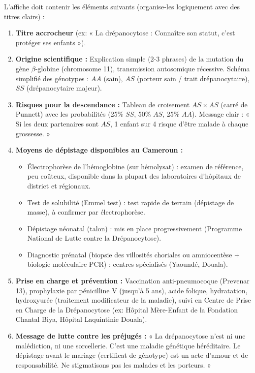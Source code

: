 \documentclass[11pt]{article}
\begin{document}
\begin{exercice}
L'affiche doit contenir les éléments suivants (organise-les logiquement avec des titres clairs) :
\begin{enumerate}
    \item \textbf{Titre accrocheur} (ex: « La drépanocytose : Connaître son statut, c'est protéger ses enfants »).
    \item \textbf{Origine scientifique :} Explication simple (2-3 phrases) de la mutation du gène $\beta$-globine (chromosome 11), transmission autosomique récessive. Schéma simplifié des génotypes : $AA$ (sain), $AS$ (porteur sain / trait drépanocytaire), $SS$ (drépanocytaire majeur).
    \item \textbf{Risques pour la descendance :} Tableau de croisement $AS \times AS$ (carré de Punnett) avec les probabilités (25\% $SS$, 50\% $AS$, 25\% $AA$). Message clair : « Si les deux partenaires sont $AS$, 1 enfant sur 4 risque d'être malade à chaque grossesse. »
    \item \textbf{Moyens de dépistage disponibles au Cameroun :}
    \begin{itemize}
        \item Électrophorèse de l'hémoglobine (sur hémolysat) : examen de référence, peu coûteux, disponible dans la plupart des laboratoires d'hôpitaux de district et régionaux.
        \item Test de solubilité (Emmel test) : test rapide de terrain (dépistage de masse), à confirmer par électrophorèse.
        \item Dépistage néonatal (talon) : mis en place progressivement (Programme National de Lutte contre la Drépanocytose).
        \item Diagnostic prénatal (biopsie des villosités choriales ou amniocentèse + biologie moléculaire PCR) : centres spécialisés (Yaoundé, Douala).
    \end{itemize}
    \item \textbf{Prise en charge et prévention :} Vaccination anti-pneumocoque (Prevenar 13), prophylaxie par pénicilline V (jusqu'à 5 ans), acide folique, hydratation, hydroxyurée (traitement modificateur de la maladie), suivi en Centre de Prise en Charge de la Drépanocytose (ex: Hôpital Mère-Enfant de la Fondation Chantal Biya, Hôpital Laquintinie Douala).
    \item \textbf{Message de lutte contre les préjugés :} « La drépanocytose n'est ni une malédiction, ni une sorcellerie. C'est une maladie génétique héréditaire. Le dépistage avant le mariage (certificat de génotype) est un acte d'amour et de responsabilité. Ne stigmatisons pas les malades et les porteurs. »

\end{enumerate}
\end{exercice}
\end{document}
